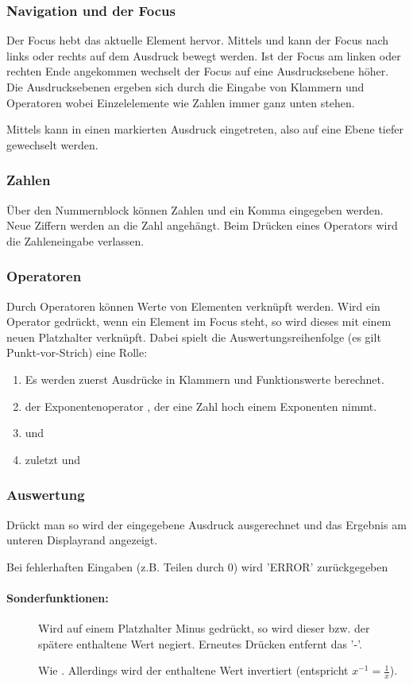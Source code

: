 \subsubsection{Navigation und der Focus}
Der Focus hebt das aktuelle Element hervor. Mittels \key{$\leftarrow$} und \key{$\rarr$} kann der Focus nach links oder rechts auf dem Ausdruck bewegt werden. 
Ist der Focus am linken oder rechten Ende angekommen wechselt der Focus auf eine Ausdrucksebene höher. 
Die Ausdrucksebenen ergeben sich durch die Eingabe von Klammern und Operatoren wobei Einzelelemente wie Zahlen immer ganz unten stehen. 

Mittels  kann in einen markierten Ausdruck eingetreten, also auf eine Ebene tiefer gewechselt werden.
\subsubsection{Zahlen}
Über den Nummernblock können Zahlen und ein Komma eingegeben werden.
Neue Ziffern werden an die Zahl angehängt. Beim Drücken eines Operators wird die Zahleneingabe verlassen.
\subsubsection{Operatoren}
Durch Operatoren können Werte von Elementen verknüpft werden. 
Wird ein Operator gedrückt, wenn ein Element im Focus steht, so wird dieses mit einem neuen Platzhalter verknüpft. Dabei spielt die Auswertungsreihenfolge (es gilt Punkt-vor-Strich) eine Rolle:
\begin{enumerate}
	\item Es werden zuerst Ausdrücke in Klammern und Funktionswerte berechnet.
	\item der Exponentenoperator \key{\^{ }}, der eine Zahl hoch einem Exponenten nimmt.
	\item \key{$\times$} und \key{/}
	\item zuletzt \key{+} und \key{-}
\end{enumerate}
\subsubsection{Auswertung}
Drückt man \key{=} so wird der eingegebene Ausdruck ausgerechnet und das Ergebnis am unteren Displayrand angezeigt. 

Bei fehlerhaften Eingaben (z.B. Teilen durch 0) wird 'ERROR' zurückgegeben
\paragraph{Sonderfunktionen:}
\begin{description}
	\item [\key{-}] Wird auf einem Platzhalter Minus gedrückt, so wird dieser bzw. der spätere enthaltene Wert negiert. Erneutes Drücken entfernt das '-'.   
	\item [\key{/}] Wie \key{-}. Allerdings wird der enthaltene Wert invertiert 
		(entspricht $x^{-1} = \frac 1 x$).
\end{description}

